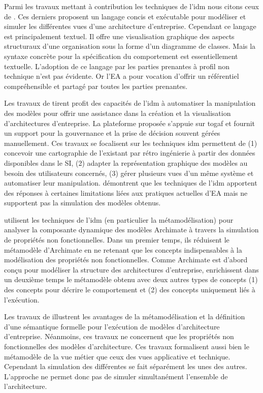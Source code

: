 Parmi les travaux mettant à contribution les techniques de l'\gls{idm} nous citons ceux de \cite{clark2011leap}. Ces derniers proposent un langage concis et exécutable pour modéliser et simuler les différentes vues d'une architecture d'entreprise. Cependant ce langage est principalement textuel. Il offre une visualisation graphique des aspects structuraux d'une organisation sous la forme d'un diagramme de classes. Mais la syntaxe concrète pour la spécification du comportement est essentiellement textuelle. L'adoption de ce langage par les parties prenantes à profil non technique n'est pas évidente. Or l'EA a pour vocation d'offrir un référentiel compréhensible et partagé par toutes les parties prenantes.

Les travaux de \cite{bruneliere2013mde} tirent profit des capacités de l'\gls{idm} à automatiser la manipulation des modèles pour offrir une assistance dans la création et la visualisation d'architectures d'entreprise. La plateforme proposée s'appuie sur \gls{togaf} et fournit un support pour la gouvernance et la prise de décision souvent gérées manuellement. Ces travaux se focalisent sur les techniques \gls{idm} permettent de (1) concevoir une cartographie de l'existant par rétro ingénierie à partir des données disponibles dans le SI, (2) adapter la représentation graphique des modèles au besoin des utilisateurs concernés, (3) gérer plusieurs vues d'un même système et automatiser leur manipulation. \cite{bruneliere2013mde} démontrent que les techniques de l'\gls{idm} apportent des réponses à certaines limitations liées aux pratiques actuelles d'EA mais ne supportent pas la simulation des modèles obtenus. 

\cite{manzur2015xarchimate} utilisent les techniques de l'\gls{idm} (en particulier la métamodélisation) pour analyser la composante dynamique des modèles Archimate à travers la simulation de propriétés non fonctionnelles. Dans un premier temps, ils réduisent le métamodèle  d'Archimate en ne retenant que les concepts indispensables à la modélisation des propriétés non fonctionnelles. Comme Archimate est d'abord conçu pour modéliser la structure des architectures d'entreprise, \cite{manzur2015xarchimate} enrichissent dans un deuxième temps le métamodèle obtenu avec deux autres types de concepts (1) des concepts pour décrire le comportement et (2) des concepts uniquement liés à l'exécution. 

Les travaux de \cite{manzur2015xarchimate} illustrent les avantages de la métamodélisation et la définition d'une sémantique formelle pour l'exécution de modèles d'architecture d'entreprise. Néanmoins, ces travaux ne concernent que les propriétés non fonctionnelles des modèles d'architecture. Ces travaux formalisent aussi bien le métamodèle de la vue métier  que ceux des vues applicative et technique. Cependant la simulation des différentes se fait séparément les unes des autres. L'approche ne permet donc pas de simuler simultanément l'ensemble de l'architecture. 


